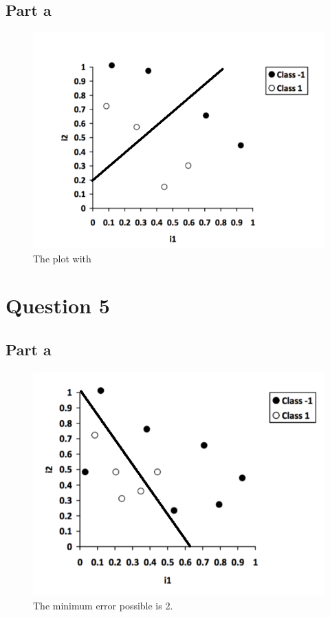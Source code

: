 \documentclass[12pt]{article}
\begin{document}
\subsection*{Part a}

\begin{figure}[H]
    \centering
    \includegraphics[width=1\textwidth]{question_4_plot_a}
    \caption{The plot with }
    \label{fig:question_4_plot_a}
\end{figure}

\section*{Question 5}

\subsection*{Part a}

\begin{figure}[H]
    \centering
    \includegraphics[width=1\textwidth]{question_5_plot_a}
    \caption{The minimum error possible is 2.}
    \label{fig:question_5_plot_a}
\end{figure}
\end{document}
